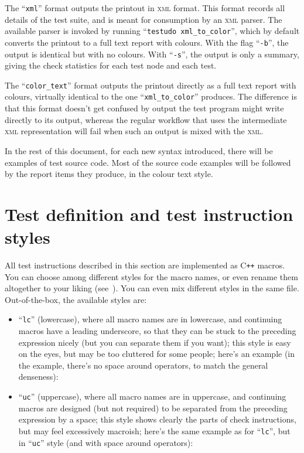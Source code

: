 \documentclass[twoside, a4paper, article]{memoir}
\newcommand*\Cpp{C\texttt{++}}
\begin{document}
The ``\texttt{xml}'' format outputs the printout in \textsc{xml} format.  This
format records all details of the test suite, and is meant for consumption by
an \textsc{xml} parser.  The available parser is invoked by running
``\texttt{testudo xml\_to\_color}'', which by default converts the printout to
a full text report with colours.  With the flag ``\texttt{-b}'', the output is
identical but with no colours.  With ``\texttt{-s}'', the output is only a
summary, giving the check statistics for each test node and each test.

The ``\texttt{color\_text}'' format outputs the printout directly as a full
text report with colours, virtually identical to the one
``\texttt{xml\_to\_color}'' produces.  The difference is that this format
doesn't get confused by output the test program might write directly to its
output, whereas the regular workflow that uses the intermediate \textsc{xml}
representation will fail when such an output is mixed with the \textsc{xml}.

In the rest of this document, for each new syntax introduced, there will be
examples of test source code.  Most of the source code examples will be
followed by the report items they produce, in the colour text style.


\chapter{Test definition and test instruction styles}
\label{cha:test-definition-test-instruction-styles}

All test instructions described in this section are implemented as \Cpp{}
macros.  You can choose among different styles for the macro names, or even
rename them altogether to your liking
(see~).  You can even mix different
styles in the same file.  Out-of-the-box, the available styles are:
\begin{itemize}
\item ``\texttt{lc}'' (lowercase), where all macro names are in lowercase, and
  continuing macros have a leading underscore, so that they can be stuck to the
  preceding expression nicely (but you can separate them if you want); this
  style is easy on the eyes, but may be too cluttered for some people; here's
  an example (in the example, there's no space around operators, to match the
  general denseness):
  

\item ``\texttt{uc}'' (uppercase), where all macro names are in uppercase, and
  continuing macros are designed (but not required) to be separated from the
  preceding expression by a space; this style shows clearly the parts of check
  instructions, but may feel excessively macroish; here's the same example as
  for ``\texttt{lc}'', but in ``\texttt{uc}'' style (and with space around
  operators): 
\end{itemize}
\end{document}
